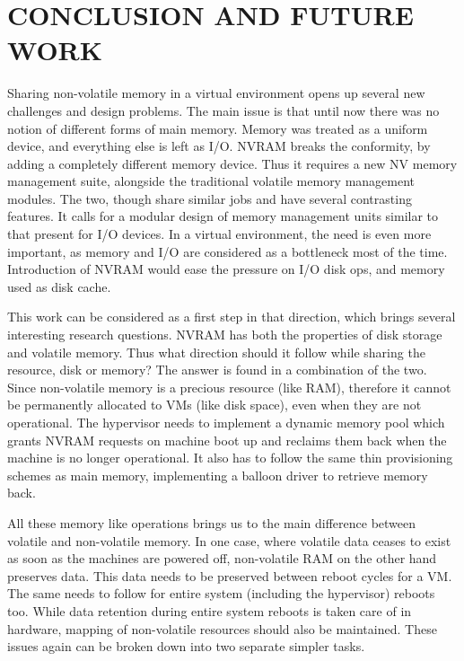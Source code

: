 
\chapter{\uppercase{Conclusion and Future Work}}


Sharing non-volatile memory in a virtual environment opens up several new challenges and design problems. The main issue is that until now there was no notion of different forms of main memory. Memory was treated as a uniform device, and everything else is left as I/O. NVRAM breaks the conformity, by adding a completely different memory device. Thus it requires a new NV memory management suite, alongside the traditional volatile memory management modules. The two, though share similar jobs and have several contrasting features. It calls for a modular design of memory management units similar to that present for I/O devices. In a virtual environment, the need is even more important, as memory and I/O are considered as a bottleneck most of the time. Introduction of NVRAM would ease the pressure on I/O disk ops, and memory used as disk cache.

This work can be considered as a first step in that direction, which brings several interesting research questions. NVRAM has both the properties of disk storage and volatile memory. Thus what direction should it follow while sharing the resource, disk or memory? The answer is found in a combination of the two. Since non-volatile memory is a precious resource (like RAM), therefore it cannot be permanently allocated to VMs (like disk space), even when they are not operational. The hypervisor needs to implement a dynamic memory pool which grants NVRAM requests on machine boot up and reclaims them back when the machine is no longer operational. It also has to follow the same thin provisioning schemes as main memory, implementing a balloon driver to retrieve memory back.

All these memory like operations brings us to the main difference between volatile and non-volatile memory. In one case, where volatile data ceases to exist as soon as the machines are powered off, non-volatile RAM on the other hand preserves data. This data needs to be preserved between reboot cycles for a VM. The same needs to follow for entire system (including the hypervisor) reboots too. While data retention during entire system reboots is taken care of in hardware, mapping of non-volatile resources should also be maintained. These issues again can be broken down into two separate simpler tasks.

